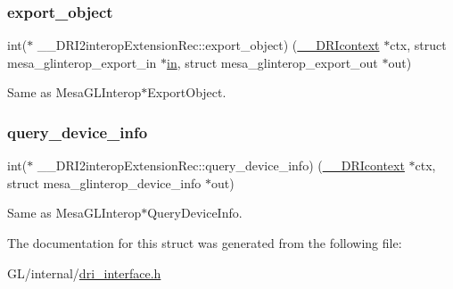 \mbox{\label{struct_____d_r_i2interop_extension_rec_aeed8c19fe5e28bb472baef24bc076bb8}} 
\subsubsection{\texorpdfstring{export\+\_\+object}{export\_object}}
{\footnotesize\ttfamily int($\ast$ \+\_\+\+\_\+\+D\+R\+I2interop\+Extension\+Rec\+::export\+\_\+object) (\hyperlink{dri__interface_8h_a3fd295cba82b5a3d79f1ee7e12bfb908}{\+\_\+\+\_\+\+D\+R\+Icontext} $\ast$ctx, struct mesa\+\_\+glinterop\+\_\+export\+\_\+in $\ast$\hyperlink{glext_8h_a83ad0ee7f1e06b59c90271716e689080}{in}, struct mesa\+\_\+glinterop\+\_\+export\+\_\+out $\ast$out)}

Same as Mesa\+G\+L\+Interop$\ast$\+Export\+Object. \mbox{\label{struct_____d_r_i2interop_extension_rec_a68eb8ce4cad172f09ddcc523d363ac19}} 
\subsubsection{\texorpdfstring{query\+\_\+device\+\_\+info}{query\_device\_info}}
{\footnotesize\ttfamily int($\ast$ \+\_\+\+\_\+\+D\+R\+I2interop\+Extension\+Rec\+::query\+\_\+device\+\_\+info) (\hyperlink{dri__interface_8h_a3fd295cba82b5a3d79f1ee7e12bfb908}{\+\_\+\+\_\+\+D\+R\+Icontext} $\ast$ctx, struct mesa\+\_\+glinterop\+\_\+device\+\_\+info $\ast$out)}

Same as Mesa\+G\+L\+Interop$\ast$\+Query\+Device\+Info. 

The documentation for this struct was generated from the following file\+:\begin{DoxyCompactItemize}
\item 
G\+L/internal/\hyperlink{dri__interface_8h}{dri\+\_\+interface.\+h}\end{DoxyCompactItemize}

